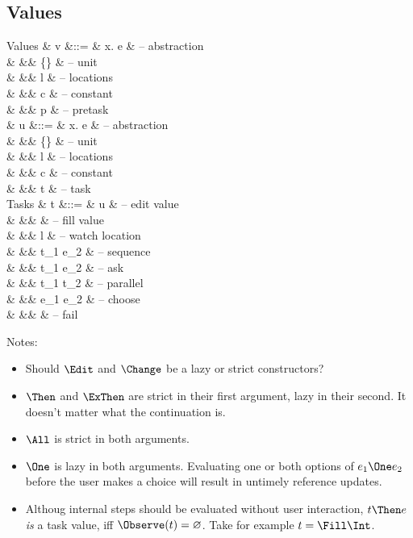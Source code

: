 \subsection{Values}

\begin{grammar}
  Values
    & v      &::= & \lambda x. e                & – abstraction \\
    &        &\mid& \{\}                        & – unit \\
    &        &\mid& l                           & – locations \\
    &        &\mid& c                           & – constant \\
    &        &\mid& p                           & – pretask \\
    & u      &::= & \lambda x. e                & – abstraction \\
    &        &\mid& \{\}                        & – unit \\
    &        &\mid& l                           & – locations \\
    &        &\mid& c                           & – constant \\
    &        &\mid& t                           & – task \\
  Tasks
    & t      &::= & \Edit u                     & – edit value \\
    &        &\mid& \Fill \beta                 & – fill value \\
    &        &\mid& \Change l                    & – watch location \\
    &        &\mid& t_1 \Then e_2               & – sequence\footnotemark \\
    &        &\mid& t_1 \ExThen e_2               & – ask \\
    &        &\mid& t_1 \All t_2                & – parallel \\
    &        &\mid& e_1 \One e_2                 & – choose \\
    &        &\mid& \Fail                       & – fail \\
\end{grammar}

Notes:
\begin{itemize}
  \item Should $\Edit$ and $\Change$ be a lazy or strict constructors?
  \item $\Then$ and $\ExThen$ are strict in their first argument, lazy in their second.
    It doesn't matter what the continuation is.
  \item $\All$ is strict in both arguments.
  \item $\One$ is lazy in both arguments.
    Evaluating one or both options of $e_1 \One e_2$ before the user makes a choice will result in untimely reference updates.
  \item Althoug internal steps should be evaluated without user interaction,
    $t \Then e$ \emph{is} a task value, iff $\Observe(t) = \nothing$.
    Take for example $t = \Fill \Int$.
\end{itemize}


